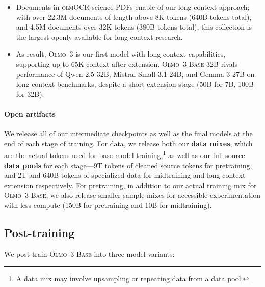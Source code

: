 \documentclass[table]{ai2style/ai2}
\newcommand{\newOlmo}{Olmo\xspace}
\newcommand{\olmothree}{\textsc{\newOlmo~3}\xspace}
\newcommand{\olmothreebase}{\textsc{\newOlmo~3 Base}\xspace}
\newcommand{\olmocr}{\textsc{olmOCR}\xspace}
\newcommand{\olmocrPDF}{{\olmocr science PDFs}\xspace}
\begin{document}
\begin{itemize}
\begin{itemize}[itemsep=2pt]
\item[$\circ$] Documents in \olmocrPDF enable of our long-context approach;
with over 22.3M documents of length above 8K tokens (640B tokens total), and 4.5M documents over 32K tokens (380B tokens total), this collection is the largest openly available for long-context research.
\item[$\circ$] As result, \olmothree is our first model with long-context capabilities, supporting up to 65K context after extension. 
\olmothreebase 32B rivals performance of Qwen 2.5 32B, Mistral Small 3.1 24B, and Gemma 3 27B on long-context benchmarks, despite a short extension stage (50B for 7B, 100B for 32B). 
\end{itemize}
\end{itemize}

\paragraph{Open artifacts}
We release all of our intermediate checkpoints as well as the final models at the end of each stage of training.
For data, we release both our {\bf{data mixes}}, which are the actual tokens used for base model training,\footnote{A data mix may involve upsampling or repeating data from a data pool.} as well as our full source {\bf{data pools}} for each stage---9T tokens of cleaned source tokens for pretraining, and 2T and 640B tokens of specialized data for midtraining and long-context extension respectively.
For pretraining, in addition to our actual training mix for \olmothreebase, we also release smaller sample mixes for accessible experimentation with less compute (150B for pretraining and 10B for midtraining).

\subsection{Post-training}
We post-train \olmothreebase{} into three model variants:
\end{document}

